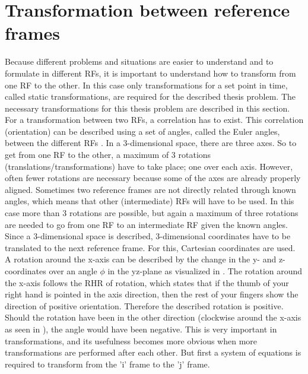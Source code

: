 \section{Transformation between reference frames}
\label{sec:transfram}
Because different problems and situations are easier to understand and to formulate in different \ac{RF}s, it is important to understand how to transform from one \ac{RF} to the other. In this case only transformations for a set point in time, called static transformations, are required for the described thesis problem. The necessary transformations for this thesis problem are described in this section.\\
For a transformation between two \ac{RF}s, a correlation has to exist. This correlation (orientation) can be described using a set of angles, called the Euler angles, between the different \ac{RF}s \citep{mooij2013stat}. In a 3-dimensional space, there are three axes. So to get from one \ac{RF} to the other, a maximum of 3 rotations (translations/transformations) have to take place; one over each axis. However, often fewer rotations are necessary because some of the axes are already properly aligned. Sometimes two reference frames are not directly related through known angles, which means that other (intermediate) \ac{RF}s will have to be used. In this case more than 3 rotations are possible, but again a maximum of three rotations are needed to go from one \ac{RF} to an intermediate \ac{RF} given the known angles. Since a 3-dimensional space is described, 3-dimensional coordinates have to be translated to the next reference frame. For this, Cartesian coordinates are used. A rotation around the x-axis can be described by the change in the y- and z-coordinates over an angle $\phi$ in the yz-plane as visualized in . The rotation around the x-axis follows the \ac{RHR} of rotation, which states that if the thumb of your right hand is pointed in the axis direction, then the rest of your fingers show the direction of positive orientation. Therefore the described rotation is positive. Should the rotation have been in the other direction (clockwise around the x-axis as seen in ), the angle would have been negative. This is very important in transformations, and its usefulness becomes more obvious when more transformations are performed after each other. But first a system of equations is required to transform from the 'i' frame to the 'j' frame. 





